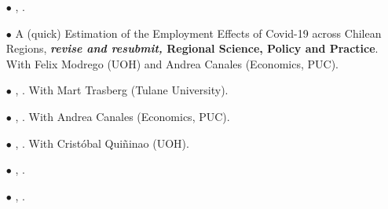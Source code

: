 \begin{itemize}

	\item[$\bullet$] \href{https://github.com/hbahamonde/Vote_Selling/raw/master/Bahamonde_VoteSellingUS.pdf}{\unskip}, {\bf \emph{\unskip}}.

	\item[$\bullet$] A (quick) Estimation of the Employment Effects of Covid-19 across Chilean Regions, {\bf \emph{revise and resubmit,} Regional Science, Policy and Practice}. With Felix Modrego (UOH) and Andrea Canales (Economics, PUC).


  	\item[$\bullet$] \href{https://github.com/hbahamonde/Inequality_State_Capacities/raw/master/Bahamonde_Trasberg.pdf}{\unskip}, {\bf \emph{\unskip}}. With Mart Trasberg (Tulane University).

  	\item[$\bullet$] \href{https://raw.githubusercontent.com/hbahamonde/Economic_Experiment_Vote_Selling/master/abstract.txt}{\unskip}, {\bf \emph{\unskip}}. With Andrea Canales (Economics, PUC).

	\item[$\bullet$] \href{https://www.hectorbahamonde.com}{\unskip}, {\bf \emph{\unskip}}. With Crist\'obal Qui\~ninao (UOH).

  	\item[$\bullet$]  \href{https://github.com/hbahamonde/Earthquake_Paper/raw/master/Bahamonde_Earthquake_Paper.pdf}{\unskip}, {\bf \emph{\unskip}}.

	\item[$\bullet$] \href{https://raw.githubusercontent.com/hbahamonde/IncomeTaxAdoption/master/abstract.txt}{\unskip}, {\bf \emph{\unskip}}.
  

\end{itemize}
